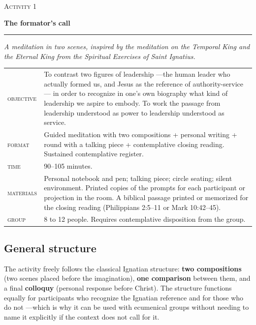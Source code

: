 \documentclass[11pt, a4paper]{article}
\newcommand{\etiqueta}[1]{\textcolor{liderazgoVino}{\scshape #1}}
\newcommand{\tituloActividad}[2]{%
  {\color{tenue}\scshape\normalsize Activity #1}\par
  \vspace{0.15em}
  {\color{liderazgoVino}\LARGE\bfseries #2}\par
  \vspace{0.3em}
  {\color{regla}\rule{\linewidth}{0.4pt}}\par
  \vspace{0.5em}
}
\begin{document}
\begin{actividad}
\tituloActividad{1}{The formator's call}
{\color{tenue}\small\itshape A meditation in two scenes, inspired by the meditation on the Temporal King and the Eternal King from the \emph{Spiritual Exercises} of Saint Ignatius.}

\vspace{0.8em}

\begin{ficha}
\begin{tabular}{@{}p{6em}@{\hspace{1em}}p{\dimexpr\linewidth-7.6em}@{}}
  \etiqueta{objective}  & To contrast two figures of leadership ---the human leader who actually formed us, and Jesus as the reference of authority-service--- in order to recognize in one's own biography what kind of leadership we aspire to embody. To work the passage from leadership understood as power to leadership understood as service. \\[0.35em]
  \etiqueta{format}     & Guided meditation with two compositions + personal writing + round with a talking piece + contemplative closing reading. Sustained contemplative register. \\[0.35em]
  \etiqueta{time}       & 90--105 minutes. \\[0.35em]
  \etiqueta{materials}  & Personal notebook and pen; talking piece; circle seating; silent environment. Printed copies of the prompts for each participant or projection in the room. A biblical passage printed or memorized for the closing reading (Philippians 2:5--11 or Mark 10:42--45). \\[0.35em]
  \etiqueta{group}      & 8 to 12 people. Requires contemplative disposition from the group.
\end{tabular}
\end{ficha}

\subsection*{General structure}

The activity freely follows the classical Ignatian structure: \textbf{two compositions} (two scenes placed before the imagination), \textbf{one comparison} between them, and a final \textbf{colloquy} (personal response before Christ). The structure functions equally for participants who recognize the Ignatian reference and for those who do not ---which is why it can be used with ecumenical groups without needing to name it explicitly if the context does not call for it.


\end{actividad}
\end{document}
